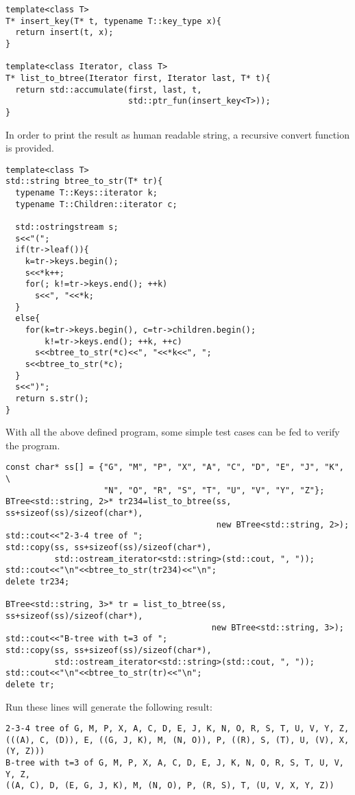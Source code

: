 \documentclass{article}
\begin{document}
\begin{lstlisting}
template<class T>
T* insert_key(T* t, typename T::key_type x){
  return insert(t, x);
}

template<class Iterator, class T>
T* list_to_btree(Iterator first, Iterator last, T* t){
  return std::accumulate(first, last, t,
                         std::ptr_fun(insert_key<T>));
}
\end{lstlisting}

In order to print the result as human readable string, a recursive
convert function is provided.

\begin{lstlisting}
template<class T>
std::string btree_to_str(T* tr){
  typename T::Keys::iterator k;
  typename T::Children::iterator c;

  std::ostringstream s;
  s<<"(";
  if(tr->leaf()){
    k=tr->keys.begin();
    s<<*k++;
    for(; k!=tr->keys.end(); ++k)
      s<<", "<<*k;
  }
  else{
    for(k=tr->keys.begin(), c=tr->children.begin();
        k!=tr->keys.end(); ++k, ++c)
      s<<btree_to_str(*c)<<", "<<*k<<", ";
    s<<btree_to_str(*c);
  }
  s<<")";
  return s.str();
}
\end{lstlisting}

With all the above defined program, some simple test cases can be
fed to verify the program.

\begin{lstlisting}
const char* ss[] = {"G", "M", "P", "X", "A", "C", "D", "E", "J", "K", \
                    "N", "O", "R", "S", "T", "U", "V", "Y", "Z"};
BTree<std::string, 2>* tr234=list_to_btree(ss, ss+sizeof(ss)/sizeof(char*),
                                           new BTree<std::string, 2>);
std::cout<<"2-3-4 tree of ";
std::copy(ss, ss+sizeof(ss)/sizeof(char*),
          std::ostream_iterator<std::string>(std::cout, ", "));
std::cout<<"\n"<<btree_to_str(tr234)<<"\n";
delete tr234;

BTree<std::string, 3>* tr = list_to_btree(ss, ss+sizeof(ss)/sizeof(char*),
                                          new BTree<std::string, 3>);
std::cout<<"B-tree with t=3 of ";
std::copy(ss, ss+sizeof(ss)/sizeof(char*),
          std::ostream_iterator<std::string>(std::cout, ", "));
std::cout<<"\n"<<btree_to_str(tr)<<"\n";
delete tr;
\end{lstlisting}

Run these lines will generate the following result:

\begin{verbatim}
2-3-4 tree of G, M, P, X, A, C, D, E, J, K, N, O, R, S, T, U, V, Y, Z,
(((A), C, (D)), E, ((G, J, K), M, (N, O)), P, ((R), S, (T), U, (V), X, (Y, Z)))
B-tree with t=3 of G, M, P, X, A, C, D, E, J, K, N, O, R, S, T, U, V, Y, Z,
((A, C), D, (E, G, J, K), M, (N, O), P, (R, S), T, (U, V, X, Y, Z))
\end{verbatim}
\end{document}
